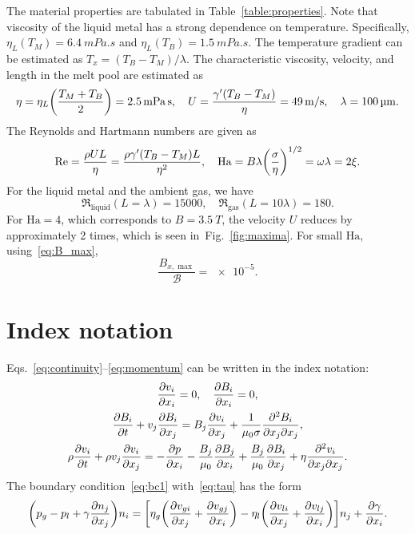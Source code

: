 \documentclass{article}
\newcommand{\Ha}{\mathrm{Ha}}
\begin{document}
The material properties are tabulated in Table~\ref{table:properties}.
Note that viscosity of the liquid metal has a strong dependence on temperature.
Specifically, $\eta_L(T_M) = \SI{6.4}{mPa.s}$ and $\eta_L(T_B) = \SI{1.5}{mPa.s}$.
The temperature gradient can be estimated as $T_x=(T_B-T_M)/\lambda$.
The characteristic viscosity, velocity, and length in the melt pool are estimated as
\begin{equation}
    \eta = \eta_L\qty(\frac{T_M+T_B}{2}) = \SI{2.5}{mPa.s}, \quad
    U = \frac{\gamma'(T_B - T_M)}{\eta} = \SI{49}{m/s}, \quad
    \lambda = \SI{100}{\um}.
\end{equation}
The Reynolds and Hartmann numbers are given as
\begin{equation}
    \Re = \frac{\rho U L}{\eta} = \frac{\rho \gamma'(T_B - T_M) L}{\eta^2}, \quad
    \Ha = B\lambda\qty(\frac{\sigma}{\eta})^{1/2} = \omega\lambda = 2\xi.
\end{equation}
For the liquid metal and the ambient gas, we have
\begin{equation}
    \Re_\text{liquid}(L=\lambda) = 15000, \quad
    \Re_\text{gas}(L=10\lambda) = 180.
\end{equation}
For $\Ha = 4$, which corresponds to $B = \SI{3.5}{T}$,
the velocity $U$ reduces by approximately 2 times, which is seen in~Fig.~\ref{fig:maxima}.
For small $\Ha$, using~\eqref{eq:B_max},
\begin{equation}
    \frac{B_{x,\max}}{\mathcal{B}} = \num{e-5}.
\end{equation}

\appendix

\section{Index notation}

Eqs.~\eqref{eq:continuity}--\eqref{eq:momentum} can be written in the index notation:
\begin{gather}
    \pdv{v_i}{x_i} = 0, \quad \pdv{B_i}{x_i} = 0, \label{eq:continuityI}\\
    \pdv{B_i}{t} + v_j\pdv{B_i}{x_j} = B_j\pdv{v_i}{x_j} + \frac1{\mu_0\sigma} \pdv[2]{B_i}{x_j}{x_j}, \label{eq:BI}\\
    \rho\pdv{v_i}{t} + \rho v_j\pdv{v_i}{x_j}
    = -\pdv{p}{x_i} - \frac{B_j}{\mu_0}\pdv{B_j}{x_i} + \frac{B_j}{\mu_0}\pdv{B_i}{x_j} + \eta\pdv[2]{v_i}{x_j}{x_j}. \label{eq:momentumI}
\end{gather}
The boundary condition~\eqref{eq:bc1} with~\eqref{eq:tau} has the form
\begin{equation}\label{eq:bc1I}
    \qty(p_g - p_l + \gamma\pdv{n_j}{x_j})n_i
    = \qty[
        \eta_g\qty( \pdv{v_{gi}}{x_j} + \pdv{v_{gj}}{x_i} )
      - \eta_l\qty( \pdv{v_{li}}{x_j} + \pdv{v_{lj}}{x_i} )
    ]n_j + \pdv{\gamma}{x_i}.
\end{equation}

\printbibliography
\end{document}
